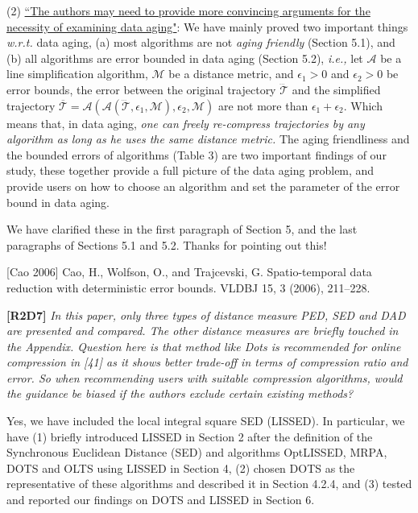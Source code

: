 \documentclass{letter}
\newcommand{\ie}{\emph{i.e.,}\xspace}
\newcommand{\wrt}{\emph{w.r.t.}\xspace}
\begin{document}
(2) \underline{``The authors may need to provide more convincing arguments for the necessity of examining data aging"}: We have mainly proved two important things \wrt data aging, (a) most algorithms are not \emph{aging friendly} (Section 5.1), and (b) all algorithms are error bounded in data aging (Section 5.2), \ie let $\mathcal{A}$ be a line simplification algorithm,  $\mathcal{M}$ be a distance metric, and $\epsilon_1>0$ and $\epsilon_2>0$ be error bounds, the error between the original trajectory $\dddot{\mathcal{T}}$ and the simplified trajectory $\overline{\mathcal{T}}=\mathcal{A}(\mathcal{A}(\dddot{\mathcal{T}}, \epsilon_1, \mathcal{M}), \epsilon_2, \mathcal{M})$ are not more than $\epsilon_1+ \epsilon_2$. Which means that, in data aging, \emph{one can freely re-compress trajectories by any algorithm as long as he uses the same distance metric.} The aging friendliness and the bounded errors of algorithms (Table 3) are two important findings of our study, these together provide a full picture of the data aging problem, and provide users on how to choose an algorithm and set the parameter of the error bound in data aging.

We have clarified these in the first paragraph of Section 5, and the last paragraphs of Sections 5.1 and 5.2. Thanks for pointing out this!

[Cao 2006] Cao, H., Wolfson, O., and Trajcevski, G. Spatio-temporal data reduction with deterministic error bounds. VLDBJ 15, 3 (2006), 211--228.


\textbf{[R2D7]} \emph{In this paper, only three types of distance measure PED, SED and DAD are presented and compared. The other distance measures are briefly touched in the Appendix. Question here is that method like Dots is recommended for online compression in [41] as it shows better trade-off in terms of compression ratio and error. So when recommending users with suitable compression algorithms, would the guidance be biased if the authors exclude certain existing methods?}

Yes, we have included the local integral square SED (LISSED). %
In particular, we have (1) briefly introduced LISSED in Section 2 after the definition of the Synchronous Euclidean Distance (SED) and algorithms OptLISSED, MRPA, DOTS and OLTS using LISSED in Section 4,   (2) chosen DOTS as the representative of these algorithms and described it in Section 4.2.4, and (3) tested and reported our findings on DOTS and LISSED in Section 6.
\end{document}
